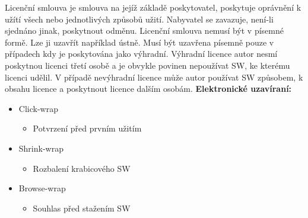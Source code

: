 \documentclass[12pt,a4paper,czech]{article}
\begin{document}
Licenční smlouva je smlouva na jejíž základě poskytovatel, poskytuje oprávnění k užítí všech nebo jednotlivých způsobů užití. Nabyvatel se zavazuje, není-li sjednáno jinak, poskytnout odměnu. 
Licenční smlouva nemusí být v písemné formě. Lze ji uzavřít například ústně. Musí být uzavřena písemně pouze v případech kdy je poskytována jako výhradní. Výhradní licence autor nesmí poskytnou licenci třetí osobě a je obvykle povinen nepoužívat SW, ke kterému licenci udělil. V případě nevýhradní licence může autor používat SW způsobem, k obsahu licence a poskytnout licence dalším osobám. 
\newline
\newline
\textbf{Elektronické uzavíraní:}
\begin{itemize}
    \item Click-wrap
    \begin{itemize}
        \item Potvrzení před prvním užitím
    \end{itemize}
    \item Shrink-wrap
    \begin{itemize}
        \item Rozbalení krabicového SW
    \end{itemize}
    \item Browse-wrap
    \begin{itemize}
        \item Souhlas před stažením SW
    \end{itemize}
\end{itemize}
  
\end{document}
